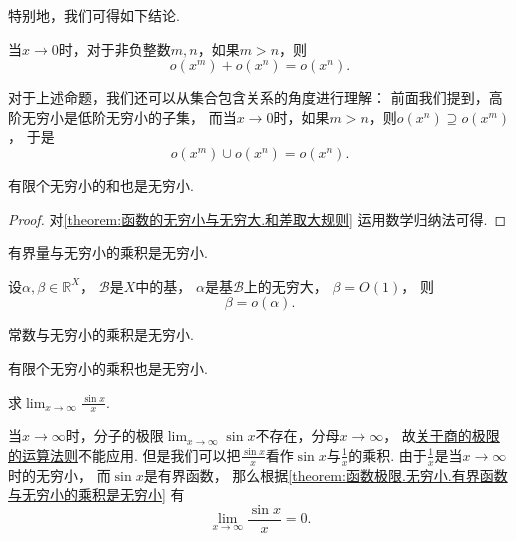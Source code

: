 特别地，我们可得如下结论.
\begin{corollary}
当\(x\to0\)时，对于非负整数\(m,n\)，如果\(m>n\)，则\[
	o(x^m) + o(x^n) = o(x^n).
\]
\end{corollary}
\begin{remark}
对于上述命题，我们还可以从集合包含关系的角度进行理解：
前面我们提到，高阶无穷小是低阶无穷小的子集，
而当\(x\to0\)时，如果\(m>n\)，则\(o(x^n) \supseteq o(x^m)\)，
于是\[
	o(x^m) \cup o(x^n) = o(x^n).
\]
\end{remark}

\begin{theorem}
有限个无穷小的和也是无穷小.
\begin{proof}
对\cref{theorem:函数的无穷小与无穷大.和差取大规则} 运用数学归纳法可得.
\end{proof}
\end{theorem}

\begin{theorem}\label{theorem:函数极限.无穷小.有界函数与无穷小的乘积是无穷小}
有界量与无穷小的乘积是无穷小.
\end{theorem}
\begin{proposition}
设\(\alpha,\beta\in\mathbb{R}^X\)，
\(\mathcal{B}\)是\(X\)中的基，
\(\alpha\)是基\(\mathcal{B}\)上的无穷大，
\(\beta=O(1)\)，
则\[
	\beta = o(\alpha).
\]
\end{proposition}

\begin{corollary}
常数与无穷小的乘积是无穷小.
\end{corollary}

\begin{corollary}
有限个无穷小的乘积也是无穷小.
\end{corollary}

\begin{example}
求\(\lim_{x\to\infty} \frac{\sin x}{x}\).
\begin{solution}
当\(x\to\infty\)时，分子的极限\(\lim_{x\to\infty} \sin x\)不存在，分母\(x\to\infty\)，
故\hyperref[theorem:极限.极限的四则运算法则]{关于商的极限的运算法则}不能应用.
但是我们可以把\(\frac{\sin x}{x}\)看作\(\sin x\)与\(\frac1x\)的乘积.
由于\(\frac1x\)是当\(x\to\infty\)时的无穷小，
而\(\sin x\)是有界函数，
那么根据\cref{theorem:函数极限.无穷小.有界函数与无穷小的乘积是无穷小}
有\begin{equation}
	\lim_{x\to\infty} \frac{\sin x}{x} = 0.
\end{equation}
\end{solution}
\end{example}

